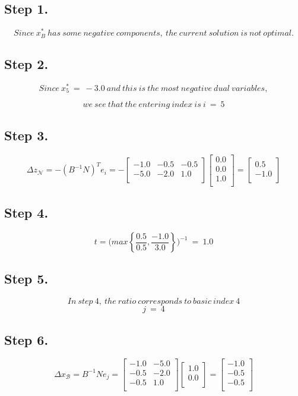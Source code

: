 \documentclass [12pt] {article}
\begin{document}
\subsection{Step 1.}
\[
Since\ x_\mathit{B}^*\ has\ some\ negative\ components,\ the\ current\ solution\ is\ not\ optimal.
\]
\subsection{Step 2.}
\[
Since\ x_5^*\ = \ -3.0\ and\ this\ is\ the\ most\ negative\ dual\ variables,
\]

\[
we\ see\ that\ the\ entering\ index\ is\  i\ =\ 5
\]
\subsection{Step 3.}
\[
\Delta z_{\mathcal N}= -( B^{-1} N )^{T}e_i = -\begin{bmatrix}
-1.0 & -0.5 & -0.5 \\ -5.0 & -2.0 & 1.0 \\ 
\end{bmatrix}
\begin{bmatrix}
0.0 \\ 0.0 \\ 1.0 \\ 
\end{bmatrix}
= \begin{bmatrix}
0.5 \\ -1.0 \\ 
\end{bmatrix}
\]
\subsection{Step 4.}
\[
t =\Bigg(
max \left\{\frac{0.5}{0.5},\frac{-1.0}{3.0}\right\}
\Bigg)^{-1}\ =\ 1.0
\]
\subsection{Step 5.}
\[
In\ step\ 4, \ the\ ratio\ corresponds\ to\ basic\ index\ 4
\]
\[
j\ = \ 4
\]
\subsection{Step 6.}
\[
\Delta x_{\mathcal B} = B^{-1} N e_j =
\begin{bmatrix}
-1.0 & -5.0 \\ -0.5 & -2.0 \\ -0.5 & 1.0 \\ 
\end{bmatrix}
\begin{bmatrix}
1.0 \\ 0.0 \\ 
\end{bmatrix}
= \begin{bmatrix}
-1.0 \\ -0.5 \\ -0.5 \\ 
\end{bmatrix}
\]
\end{document}
